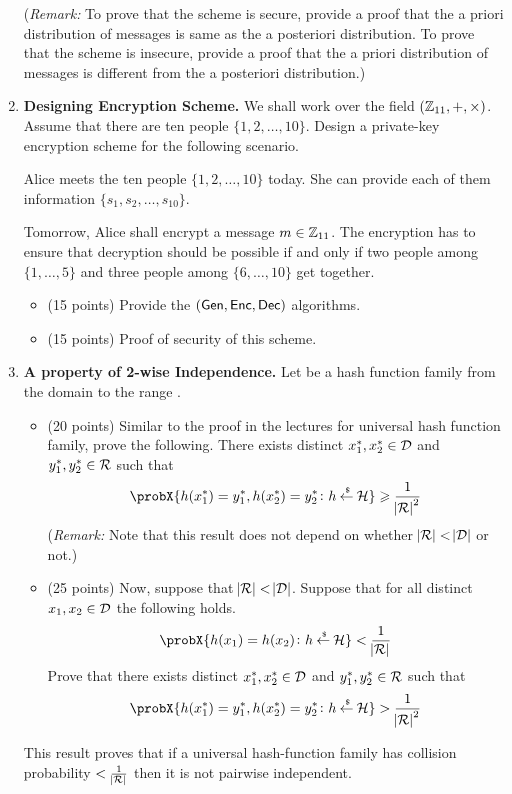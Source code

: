 \documentclass[11pt]{article}
\newcommand{\nextoddpage}{\checkoddpage\ifoddpage{\ \newpage\ \newpage}\else{\ \newpage}\fi}
\begin{document}
\begin{enumerate}
  (\footnotesize{\em Remark:} 
    To prove that the scheme is secure, provide a proof that the a priori distribution of messages is same as the a posteriori distribution. 
    To prove that the scheme is insecure, provide a proof that the a priori distribution of messages is different from the a posteriori distribution.)
    
    
    
\nextoddpage 
\item {\bfseries Designing Encryption Scheme.} 
  We shall work over the field $({\mathbb Z}_{11},+,\times)$. 
  Assume that there are ten people $\{1,2,\dotsc,10\}$. 
  Design a private-key encryption scheme for the following scenario. 
  
  Alice meets the ten people $\{1,2,\dotsc,10\}$ today. 
  She can provide each of them information $\{s_1,s_2,\dotsc,s_{10}\}$. 
  
  Tomorrow, Alice shall encrypt a message $m\in{\mathbb Z}_{11}$. 
  The encryption has to ensure that decryption should be possible if and only if two people among $\{1,\dotsc,5\}$ and three people among $\{6,\dotsc,10\}$ get together.
  
  
  \begin{itemize}
  \item (15 points) Provide the $(\mathsf{Gen},\mathsf{Enc},\mathsf{Dec})$ algorithms. 
  \item (15 points) Proof of security of this scheme. 
  \end{itemize} 






\nextoddpage 
\item {\bfseries A property of 2-wise Independence.} 
  Let \cH be a hash function family from the domain \cD to the range \cR. 
  \begin{itemize}
  \item (20 points) Similar to the proof in the lectures for universal hash function family, prove the following. 
    There exists distinct $x_1^*,x_2^*\in{\mathcal D}$ and $y_1^*,y_2^*\in{\mathcal R}$ such that 
      $$\probX{h(x^*_1)=y^*_1,h(x^*_2)=y^*_2\colon h\getsr\cH} \geq \frac1{\abs\cR^2}$$
    ({\em Remark:} Note that this result does not depend on whether $\abs{{\mathcal R}} < \abs{{\mathcal D}}$ or not.) 
  \item (25 points) Now, suppose that $\abs{{\mathcal R}} < \abs{{\mathcal D}}$. 
    Suppose that for all distinct $x_1,x_2\in{\mathcal D}$ the following holds.  
    $$\probX{h(x_1)=h(x_2)\colon h\getsr\cH} < \frac1{\abs\cR}$$
    Prove that there exists distinct $x_1^*,x_2^*\in{\mathcal D}$ and $y_1^*,y_2^*\in{\mathcal R}$ such that 
      $$\probX{h(x^*_1)=y^*_1,h(x^*_2)=y^*_2\colon h\getsr\cH} > \frac1{\abs\cR^2}$$
  \end{itemize}
  This result proves that if a universal hash-function family has collision probability $<\frac1{\abs{{\mathcal R}}}$ then it is not pairwise independent. 




\end{enumerate}
\end{document}
